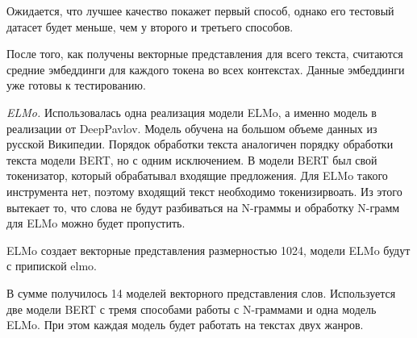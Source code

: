 \documentclass[a4paper,14pt]{article}
\begin{document}
Ожидается, что лучшее качество покажет первый способ, однако его тестовый датасет будет меньше, чем у второго и третьего способов. 

После того, как получены векторные представления для всего текста, считаются средние эмбеддинги для каждого токена во всех контекстах.
Данные эмбеддинги уже готовы к тестированию.

\textit{ELMo.} Использовалась одна реализация модели ELMo, а именно модель в реализации от DeepPavlov.
Модель обучена на большом объеме данных из русской Википедии.
Порядок обработки текста аналогичен порядку обработки текста модели BERT, но с одним исключением.
В модели BERT был свой токенизатор, который обрабатывал входящие предложения.
Для ELMo такого инструмента нет, поэтому входящий текст необходимо токенизирвоать.
Из этого вытекает то, что слова не будут разбиваться на N-граммы и обработку N-грамм для ELMo можно будет пропустить.

ELMo создает векторные представления размерностью 1024, модели ELMo будут с припиской elmo.

В сумме получилось 14 моделей векторного представления слов.
Используется две модели BERT с тремя способами работы с N-граммами и одна модель ELMo.
При этом каждая модель будет работать на текстах двух жанров.
\end{document}
